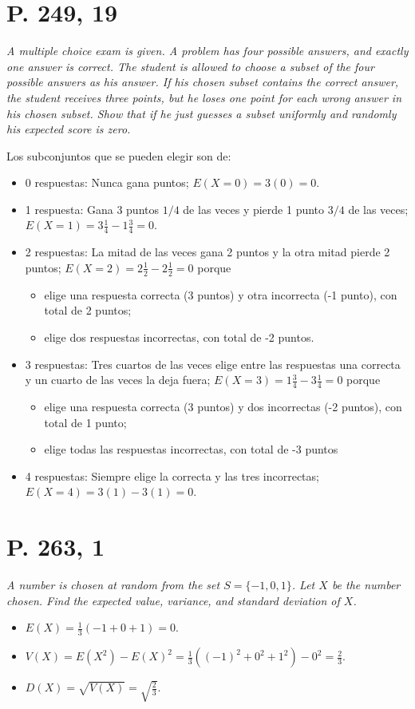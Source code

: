 \documentclass[paper=leter, fontsize=11pt]{scrartcl}
\numberwithin{equation}{section}		%
\numberwithin{figure}{section}			%
\numberwithin{table}{section}				%
\begin{document}
\section*{P. 249, 19}
\emph{A multiple choice exam is given. A problem has four possible answers, and exactly one answer is correct. The student is allowed to choose a subset of the four possible answers as his answer. If his chosen subset contains the correct answer, the student receives three points, but he loses one point for each wrong answer in his chosen subset. Show that if he just guesses a subset uniformly and randomly his expected score is zero.}

Los subconjuntos que se pueden elegir son de:

\begin{itemize}
    \item 0 respuestas: Nunca gana puntos; $E(X = 0) = 3 (0) = 0$.
    \item 1 respuesta:  Gana 3 puntos $1/4$ de las veces y pierde 1 punto $3/4$ de las veces; $E(X = 1) = 3 \frac{1}{4} - 1 \frac{3}{4} = 0$.
    \item 2 respuestas: La mitad de las veces gana 2 puntos y la otra mitad pierde 2 puntos; $E(X = 2) = 2 \frac{1}{2} -2 \frac{1}{2} = 0$ porque
    \begin{itemize}
        \item elige una respuesta correcta (3 puntos) y otra incorrecta (-1 punto), con total de 2 puntos;
        \item elige dos respuestas incorrectas, con total de -2 puntos.
    \end{itemize}
    \item 3 respuestas: Tres cuartos de las veces elige entre las respuestas una correcta y un cuarto de las veces la deja fuera; $E(X = 3) = 1 \frac{3}{4} -3 \frac{1}{4} = 0$ porque
    \begin{itemize}
        \item elige una respuesta correcta (3 puntos) y dos incorrectas (-2 puntos), con total de 1 punto;
        \item elige todas las respuestas incorrectas, con total de -3 puntos
    \end{itemize}
    \item 4 respuestas: Siempre elige la correcta y las tres incorrectas; $E(X = 4) = 3 (1) - 3 (1) = 0$.
\end{itemize}

\section*{P. 263, 1}
\emph{A number is chosen at random from the set \( S = \lbrace -1, 0, 1 \rbrace \). Let \(X\) be the number chosen. Find the expected value, variance, and standard deviation of \(X\).}
\begin{itemize}
    \item $E(X) = \frac{1}{3} (-1 + 0 + 1) = 0$.
    \item $V(X) = E(X^2) - E(X)^2 = \frac{1}{3}((-1)^2 + 0^2 + 1^2) - 0^2 = \frac{2}{3}$.
    \item $D(X) = \sqrt{V(X)} = \sqrt{\frac{2}{3}}$.
\end{itemize}
\end{document}
